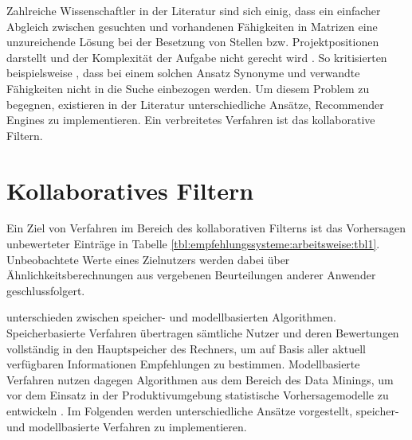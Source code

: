 Zahlreiche Wissenschaftler in der Literatur sind sich einig, dass ein einfacher Abgleich zwischen gesuchten und vorhandenen Fähigkeiten in Matrizen eine unzureichende Lösung bei der Besetzung von Stellen bzw. Projektpositionen darstellt \cite[S. 1f.]{enhancingERecruitment:2012}\cite[S. 1]{faerber:2003}\cite[S. 2]{prospect:2010} und der Komplexität der Aufgabe nicht gerecht wird \cite[S. 1]{malinowski:2008}. So kritisierten beispielsweise \textcite[S. 1f.]{mitre:2014}, dass bei einem solchen Ansatz Synonyme und verwandte Fähigkeiten nicht in die Suche einbezogen werden. Um diesem Problem zu begegnen, existieren in der Literatur unterschiedliche Ansätze, Recommender Engines zu implementieren. Ein verbreitetes Verfahren ist das kollaborative Filtern.

\section{Kollaboratives Filtern}
\label{ch:empfehlungssysteme:cf}
Ein Ziel von Verfahren im Bereich des kollaborativen Filterns ist das Vorhersagen unbewerteter Einträge in Tabelle \ref{tbl:empfehlungssysteme:arbeitsweise:tbl1}. Unbeobachtete Werte eines Zielnutzers werden dabei über Ähnlichkeitsberechnungen aus vergebenen Beurteilungen anderer Anwender geschlussfolgert. \cite[S. 1]{su:2009}

\textcite[S. 3]{breese:1998} unterschieden zwischen speicher- und modellbasierten Algorithmen. Speicherbasierte Verfahren übertragen sämtliche Nutzer und deren Bewertungen vollständig in den Hauptspeicher des Rechners, um auf Basis aller aktuell verfügbaren Informationen Empfehlungen zu bestimmen. Modellbasierte Verfahren nutzen dagegen Algorithmen aus dem Bereich des Data Minings, um vor dem Einsatz in der Produktivumgebung statistische Vorhersagemodelle zu entwickeln \cite[S. 9]{recommenderSystems:2016}\cite[S. 3]{breese:1998}\cite[S. 11]{schafer:2007}. Im Folgenden werden unterschiedliche Ansätze vorgestellt, speicher- und modellbasierte Verfahren zu implementieren.

